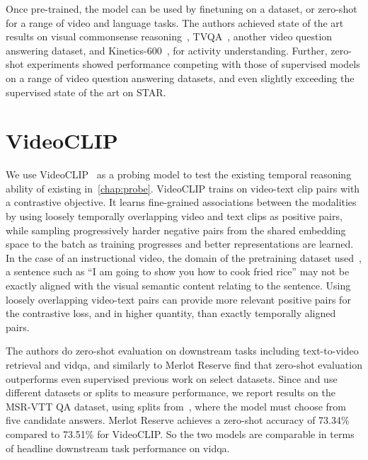 Once pre-trained, the model can be used by finetuning on a dataset, or
zero-shot for a range of video and language tasks. The authors achieved state
of the art results on visual commonsense reasoning~\citep{zellers2019vcr},
TVQA~\citep{antol2015vqa}, another video question answering dataset, and
Kinetics-600~\citep{carreira2018kinetics600}, for activity understanding.
Further, zero-shot experiments showed performance competing with those of
supervised models on a range of video question answering datasets, and even
slightly exceeding the supervised state of the art on STAR.

\section{VideoCLIP}
\label{sec:videoclip}

We use VideoCLIP~\citep{xu2021videoclip} as a probing model to test the
existing temporal reasoning ability of existing 
in~\cref{chap:probe}. VideoCLIP trains on video-text clip pairs with a
contrastive objective. It learns fine-grained associations between the
modalities by using loosely temporally overlapping video and text clips as
positive pairs, while sampling progressively harder negative pairs from the
shared embedding space to the batch as training progresses and better
representations are learned. In the case of an instructional video, the domain
of the pretraining dataset used~\citep{miech2019howto100m}, a sentence such as
``I am going to show you how to cook fried rice'' may not be exactly aligned
with the visual semantic content relating to the sentence. Using loosely
overlapping video-text pairs can provide more relevant positive pairs for the
contrastive loss, and in higher quantity, than exactly temporally aligned
pairs. 

The authors do zero-shot evaluation on downstream tasks including
text-to-video retrieval and \acrshort{vidqa}, and similarly to Merlot Reserve
find that zero-shot evaluation outperforms even supervised previous work on
select datasets. Since \citet{zellers2022mreserve} and \citet{xu2021videoclip} use
different datasets or splits to measure performance, we report results on
the MSR-VTT QA dataset, using splits from~\citet{xu2017video}, where the
model must choose from five candidate answers. Merlot Reserve achieves a
zero-shot accuracy of 73.34\% compared to 73.51\% for VideoCLIP. So the two
models are comparable in terms of headline downstream task performance on
\acrlong{vidqa}.
